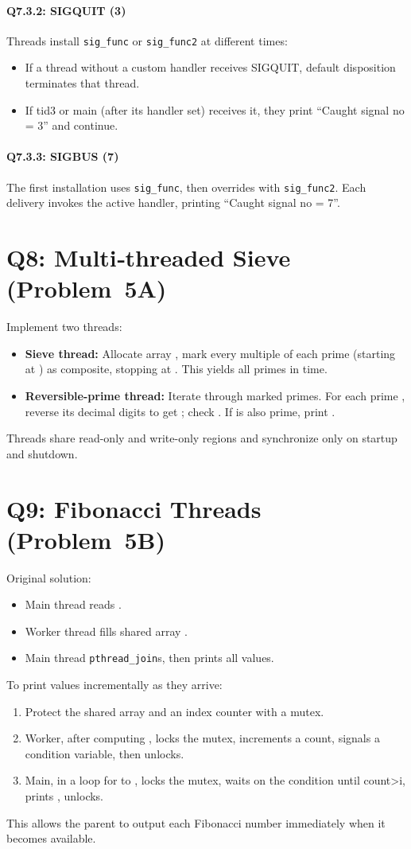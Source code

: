 \documentclass[12pt]{article}
\begin{document}
	\paragraph{Q7.3.2: SIGQUIT (3)}
	Threads install \texttt{sig\_func} or \texttt{sig\_func2} at different times:
	\begin{itemize}
		\item If a thread without a custom handler receives SIGQUIT, default disposition terminates that thread.
		\item If tid3 or main (after its handler set) receives it, they print ``Caught signal no = 3'' and continue.
	\end{itemize}
	
	\paragraph{Q7.3.3: SIGBUS (7)}
	The first installation uses \texttt{sig\_func}, then overrides with \texttt{sig\_func2}. Each delivery invokes the active handler, printing ``Caught signal no = 7''.
	
	\section*{Q8: Multi‐threaded Sieve (Problem 5A)}
	Implement two threads:
	\begin{itemize}
		\item \textbf{Sieve thread:} Allocate array , mark every multiple of each prime  (starting at ) as composite, stopping at . This yields all primes in  time.
		\item \textbf{Reversible-prime thread:} Iterate through marked primes. For each prime , reverse its decimal digits to get ; check . If  is also prime, print .
	\end{itemize}
	Threads share read-only and write-only regions and synchronize only on startup and shutdown.
	
	\section*{Q9: Fibonacci Threads (Problem 5B)}
	Original solution:
	\begin{itemize}
		\item Main thread reads .
		\item Worker thread fills shared array .
		\item Main thread \texttt{pthread\_join}s, then prints all values.
	\end{itemize}
	
	To print values incrementally as they arrive:
	\begin{enumerate}
		\item Protect the shared array and an index counter with a mutex.
		\item Worker, after computing , locks the mutex, increments a count, signals a condition variable, then unlocks.
		\item Main, in a loop for  to , locks the mutex, waits on the condition until count>i, prints , unlocks.
	\end{enumerate}
	This allows the parent to output each Fibonacci number immediately when it becomes available.
	
\end{document}
